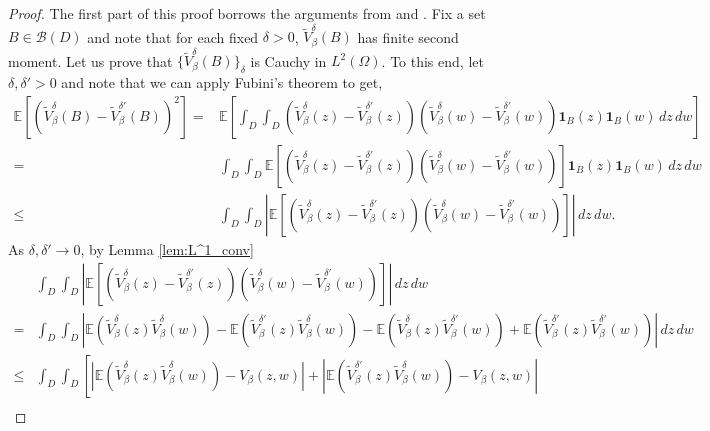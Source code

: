 \documentclass[a4paper, 11pt, reqno]{amsart}
\theoremstyle{definition} \newtheorem{defn}{Definition}[section]
\theoremstyle{remark} \newtheorem{rem}[defn]{Remark}
\theoremstyle{remark} \newtheorem*{rem*}{Remark}
\theoremstyle{plain} \newtheorem{thm}[defn]{Theorem}
\theoremstyle{plain} \newtheorem{lem}[defn]{Lemma}
\theoremstyle{plain} \newtheorem{prop}[defn]{Proposition}
\theoremstyle{plain} \newtheorem{cor}[defn]{Corollary}
\theoremstyle{remark} \newtheorem{exm}[defn]{\textbf{Example}}
\theoremstyle{remark} \newtheorem{exms}[defn]{\textbf{Examples}}
\theoremstyle{remark} \newtheorem*{bl}{}
\numberwithin{equation}{section} %
\newcommand{\mc}{\mathcal}
\newcommand{\E}{\mathbb{E}}
\newcommand{\ind}{\mathbf{1}}
\begin{document}
	\begin{proof}	
		   The first part of this proof borrows the arguments from \cite[Theorem 3.3]{cgpr21} and \cite[Theorem 5.1]{vcl18}. Fix a set $B \in \mc{B}(D)$ and note that for each fixed $\delta>0$, $\tilde{V}^{\delta}_{\beta}(B)$ has finite second moment. Let us prove that $\{\tilde{V}^{\delta}_{\beta}(B)\}_{\delta}$ is Cauchy in $L^2(\Omega)$. To this end, let $\delta, \delta'>0$ and note that we can apply Fubini's theorem to get,
		\begin{align}\label{eq:V_delta_cauchy_1}
			 \E \left[  (\tilde{V}^{\delta}_{\beta} (B) - \tilde{V}^{\delta'}_{\beta} (B) )^2\right]
			= & \E \left[ \int_D \int_D (\tilde{V}^{\delta}_{\beta}(z) - \tilde{V}^{\delta'}_{\beta}(z)) (\tilde{V}^{\delta}_{\beta}(w) - \tilde{V}^{\delta'}_{\beta}(w)) \ind_B(z) \ind_B(w)  \, dz  \, dw \right]
			\nonumber \\
			= &  \int_D \int_D \E [(\tilde{V}^{\delta}_{\beta}(z) - \tilde{V}^{\delta'}_{\beta}(z)) (\tilde{V}^{\delta}_{\beta}(w) - \tilde{V}^{\delta'}_{\beta}(w))] \ind_B(z) \ind_B(w)  \, dz  \, dw 
			\nonumber \\
			\le &    \int_D \int_D | \E [(\tilde{V}^{\delta}_{\beta}(z) - \tilde{V}^{\delta'}_{\beta}(z)) (\tilde{V}^{\delta}_{\beta}(w) - \tilde{V}^{\delta'}_{\beta}(w))] | \, dz  \, dw. 
		\end{align}
		As $\delta, \delta' \to 0$, by Lemma \ref{lem:L^1_conv}
		\begin{align}\label{eq:V_delta_cauchy_2}
			&\int_D \int_D |\E [(\tilde{V}^{\delta}_{\beta}(z) - \tilde{V}^{\delta'}_{\beta}(z)) (\tilde{V}^{\delta}_{\beta}(w) - \tilde{V}^{\delta'}_{\beta}(w))]| \, dz  \, dw
			\nonumber \\
			= &  \int_D \int_D | \E( \tilde{V}^{\delta}_{\beta}(z) \tilde{V}^{\delta}_{\beta}(w)) - \E(\tilde{V}^{\delta'}_{\beta}(z)\tilde{V}^{\delta}_{\beta}(w) )- \E(\tilde{V}^{\delta}_{\beta}(z)\tilde{V}^{\delta'}_{\beta}(w)) + \E(\tilde{V}^{\delta'}_{\beta}(z) \tilde{V}^{\delta'}_{\beta}(w))  | \, dz  \, dw
			\nonumber \\
			\le & \int_D \int_D \left[ | \E( \tilde{V}^{\delta}_{\beta}(z) \tilde{V}^{\delta}_{\beta}(w)) - V_{\beta}(z,w)| + |\E(\tilde{V}^{\delta'}_{\beta}(z)\tilde{V}^{\delta}_{\beta}(w) ) - V_{\beta}(z,w) | \right.
			\nonumber \\

\end{align}
\end{proof}
\end{document}
